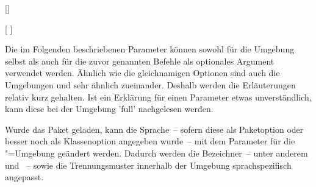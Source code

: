 \begin{Declaration*}{}
\begin{Declaration*}{}
\begin{Declaration*}{}
\begin{Declaration}{[]}
\begin{Declaration}{%
  [%
  ]%
}
\begin{Declaration}{}
\begin{Declaration}{}
\begin{Declaration}{%
}
\begin{Declaration}{%
}
\begin{Declaration}{}
\begin{Declaration}{%
}
\begin{Declaration}{}
\begin{Declaration}{}
\begin{Declaration}{}
Die im Folgenden beschriebenen Parameter können sowohl für die Umgebung 
 selbst als auch für die zuvor genannten Befehle als 
optionales Argument verwendet werden. Ähnlich wie die gleichnamigen Optionen 
sind auch die Umgebungen  und  
sehr ähnlich zueinander. Deshalb werden die Erläuterungen relativ kurz 
gehalten. Ist ein Erklärung für einen Parameter etwas unverständlich, kann 
diese bei der Umgebung 'full' nachgelesen werden.

Wurde das Paket  geladen, kann die Sprache~-- sofern diese als 
Paketoption oder besser noch als Klassenoption angegeben wurde~-- mit dem 
Parameter  für die 
"=Umgebung geändert werden. Dadurch werden die 
Bezeichner~-- unter anderem  und ~-- 
sowie die Trennungsmuster innerhalb der Umgebung sprachspezifisch angepasst. 


\end{Declaration}
\end{Declaration}
\end{Declaration}
\end{Declaration}
\end{Declaration}
\end{Declaration}
\end{Declaration}
\end{Declaration}
\end{Declaration}
\end{Declaration}
\end{Declaration}
\end{Declaration*}
\end{Declaration*}
\end{Declaration*}
